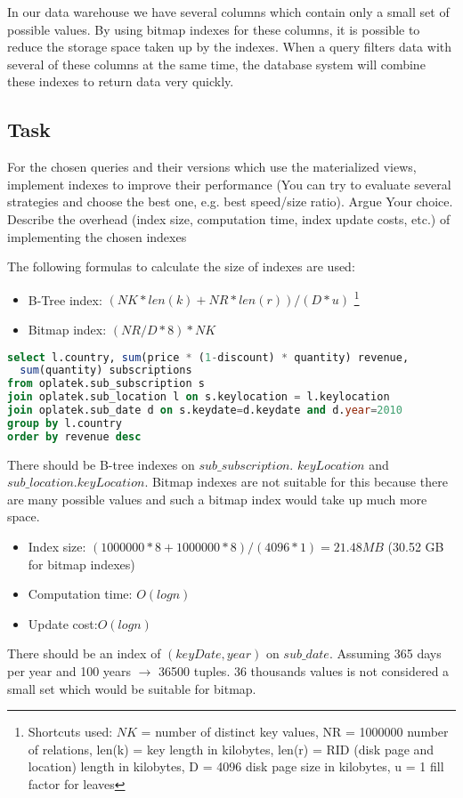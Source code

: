 In our data warehouse we have several columns which contain only a small set of possible values. By using bitmap indexes for these columns, it is possible to reduce the storage space taken up by the indexes. When a query filters data with several of these columns at the same time, the database system will combine these indexes to return data very quickly.


\subsection*{Task} 
For the chosen queries and their versions which use the materialized views,
implement indexes to improve their performance (You can try to evaluate
several strategies and choose the best one, e.g. best speed/size ratio).
Argue Your choice. Describe the overhead (index size, computation time,
index update costs, etc.) of implementing the chosen indexes

The following formulas to calculate the size of indexes are used: 
\begin{itemize}
    \item B-Tree index: $(NK*len(k)+NR*len(r))/(D*u)$ \footnote{
Shortcuts used: $NK$ = number of distinct key values, NR = 1000000 number of relations, len(k) = key length in kilobytes, len(r) = RID (disk page and location) length in kilobytes, D = 4096 disk page size in kilobytes, u = 1 fill factor for leaves}
    \item Bitmap index: $(NR/D*8)*NK$
\end{itemize}

\begin{lstlisting}[language=sql]
select l.country, sum(price * (1-discount) * quantity) revenue, 
  sum(quantity) subscriptions 
from oplatek.sub_subscription s 
join oplatek.sub_location l on s.keylocation = l.keylocation 
join oplatek.sub_date d on s.keydate=d.keydate and d.year=2010
group by l.country 
order by revenue desc
\end{lstlisting}

There should be B-tree indexes on $sub\_subscription$. $ keyLocation$ and $sub\_location.keyLocation$. Bitmap indexes are not suitable for this because there are many possible values and such a bitmap index would take up much more space.
\begin{itemize}
\item Index size: $(1000000*8+1000000*8)/(4096*1) = 21.48 MB$ (30.52 GB for bitmap indexes)
\item Computation time: $O(log n)$
\item Update cost:$O(log n)$
\end{itemize}

There should be an index of $(keyDate, year)$ on $sub\_date$. Assuming 365 days per year and 100 years $\rightarrow$ 36500 tuples. 36 thousands values is not considered a small set which would be suitable for bitmap. 
